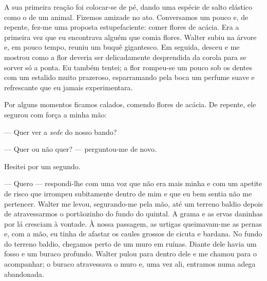 

A sua primeira reação foi colocar-se de pé, dando uma espécie de salto
elástico como o de um animal. Fizemos amizade no ato. Conversamos um pouco e,
de repente, fez-me uma proposta estupefaciente: comer flores de acácia. Era a
primeira vez que eu encontrava alguém que comia flores. Walter subiu na
árvore e, em pouco tempo, reuniu um buquê gigantesco. Em seguida, desceu e me
mostrou como a flor deveria ser delicadamente desprendida da corola para se
sorver só a ponta. Eu também tentei; a flor rompeu-se um pouco sob os dentes
com um estalido muito prazeroso, esparramando pela boca um perfume suave e
refrescante que eu jamais experimentara.

Por alguns momentos ficamos calados, comendo flores de acácia. De repente, ele
segurou com força a minha mão: 

--- Quer ver a \textit{sede} do nosso bando?


--- Quer ou não quer? --- perguntou-me de novo. 

Hesitei por um segundo. 

--- Quero --- respondi-lhe com uma voz que não era mais minha e com um apetite
    de risco que irrompeu subitamente dentro de mim e que eu bem sentia não
    me pertencer. Walter me levou, segurando-me pela mão, até um terreno
    baldio depois de atravessarmos o portãozinho do fundo do quintal. A grama
    e as ervas daninhas por lá cresciam à vontade. À nossa passagem, as
    urtigas queimavam-me as pernas e, com a mão, eu tinha de afastar os
    caules grossos de cicuta e bardana. No fundo do terreno baldio, chegamos
    perto de um muro em ruínas. Diante dele havia um fosso e um buraco
    profundo. Walter pulou para dentro dele e me chamou para o acompanhar; o
    buraco atravessava o muro e, uma vez ali, entramos numa adega
    abandonada.

